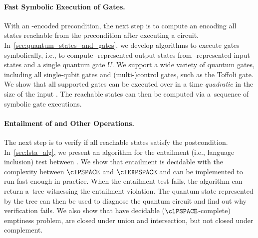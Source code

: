 \paragraph{Fast Symbolic Execution of Gates.}
With an \lsta-encoded precondition, the next step is to compute an \lsta encoding all states reachable from the precondition after executing a circuit.
In~\cref{sec:quantum_states_and_gates}, we develop algorithms to execute gates symbolically, i.e., to compute \lsta-represented output states from \lsta-represented input states and a single quantum gate $U$. 
We support a wide variety of quantum gates, including all single-qubit gates
and (multi-)control gates, such as the Toffoli gate. 
We show that all supported gates can be executed over \lstas in a time
\emph{quadratic} in the size of the input \lsta. The reachable states can then be computed via a~sequence of symbolic gate executions.




\paragraph{Entailment of \lstas and Other Operations.} The next step is to verify if all reachable states satisfy the postcondition. In~\cref{sec:lsta_alg}, we present an algorithm for the entailment (i.e., language inclusion) test between \lstas. We show 
that \lsta entailment is decidable with the complexity
between $\clPSPACE$ and $\clEXPSPACE$ and can be implemented to run fast enough in practice.
When the entailment test fails, the algorithm can return a~tree witnessing the entailment violation.
The quantum state represented by the tree can then be used to diagnose the quantum circuit and find out why verification fails.
We also show that \lstas have decidable ($\clPSPACE$-complete) emptiness problem, are closed under union and intersection, but not closed under complement.


